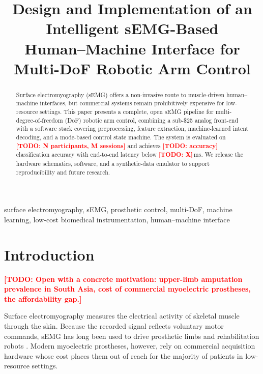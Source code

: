 \documentclass[conference]{IEEEtran}
\newcommand{\todo}[1]{\textcolor{red}{\textbf{[TODO: #1]}}}
\begin{document}
\title{Design and Implementation of an Intelligent sEMG-Based\\
Human--Machine Interface for Multi-DoF Robotic Arm Control}

\author{
}

\maketitle

\begin{abstract}
Surface electromyography (sEMG) offers a non-invasive route to muscle-driven
human--machine interfaces, but commercial systems remain prohibitively
expensive for low-resource settings. This paper presents a complete, open
sEMG pipeline for multi-degree-of-freedom (DoF) robotic arm control,
combining a sub-\$25 analog front-end with a software stack covering
preprocessing, feature extraction, machine-learned intent decoding, and a
mode-based control state machine. The system is evaluated on
\todo{N participants, M sessions} and achieves \todo{accuracy} classification
accuracy with end-to-end latency below \todo{X}\,ms. We release the hardware
schematics, software, and a synthetic-data emulator to support
reproducibility and future research.
\end{abstract}

\begin{IEEEkeywords}
surface electromyography, sEMG, prosthetic control, multi-DoF, machine
learning, low-cost biomedical instrumentation, human--machine interface
\end{IEEEkeywords}

\section{Introduction}
\label{sec:intro}

\todo{Open with a concrete motivation: upper-limb amputation prevalence in
South Asia, cost of commercial myoelectric prostheses, the affordability
gap.}

Surface electromyography measures the electrical activity of skeletal
muscle through the skin. Because the recorded signal reflects voluntary
motor commands, sEMG has long been used to drive prosthetic limbs and
rehabilitation robots \cite{oskoei2007myoelectric, atzori2014review}.
Modern myoelectric prostheses, however, rely on commercial acquisition
hardware whose cost places them out of reach for the majority of patients
in low-resource settings.
\end{document}
